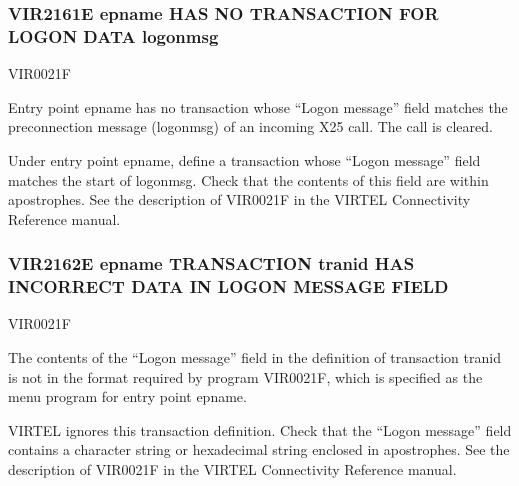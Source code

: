 \documentclass[letterpaper,10pt,english]{sphinxmanual}
\begin{document}
\subsubsection{VIR2161E epname HAS NO TRANSACTION FOR LOGON DATA logonmsg}
\label{\detokenize{messages:vir2161e-epname-has-no-transaction-for-logon-data-logonmsg}}\begin{description}
\sphinxAtStartPar
VIR0021F

\sphinxAtStartPar
Entry point epname has no transaction whose “Logon message” field matches the preconnection message (logonmsg) of an incoming X25 call. The call is cleared.

\sphinxAtStartPar
Under entry point epname, define a transaction whose “Logon message” field matches the start of logonmsg. Check that the contents of this field are within apostrophes. See the description of VIR0021F in the VIRTEL Connectivity Reference manual.

\end{description}


\subsubsection{VIR2162E epname TRANSACTION tranid HAS INCORRECT DATA IN LOGON MESSAGE FIELD}
\label{\detokenize{messages:vir2162e-epname-transaction-tranid-has-incorrect-data-in-logon-message-field}}\begin{description}
\sphinxAtStartPar
VIR0021F

\sphinxAtStartPar
The contents of the “Logon message” field in the definition of transaction tranid is not in the format required by program VIR0021F, which is specified as the menu program for entry point epname.

\sphinxAtStartPar
VIRTEL ignores this transaction definition. Check that the “Logon message” field contains a character string or hexadecimal string enclosed in apostrophes. See the description of VIR0021F in the VIRTEL Connectivity Reference manual.

\end{description}
\end{document}
